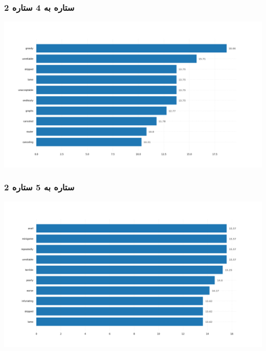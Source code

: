 \subsubsection{\Large 2 ستاره به 4 ستاره}
            { \selectfont \setLR
            \begin{center}
            \includegraphics[scale=0.4]{Images/rel_norm_freq_2_4.png}
            \end{center}
            \begin{adjustbox}{width=\textwidth}
            \end{adjustbox}
            }
\subsubsection{\Large 2 ستاره به 5 ستاره}
            { \selectfont \setLR
            \begin{center}
            \includegraphics[scale=0.4]{Images/rel_norm_freq_2_5.png}
            \end{center}
            \begin{adjustbox}{width=\textwidth}
            \end{adjustbox}
            }

